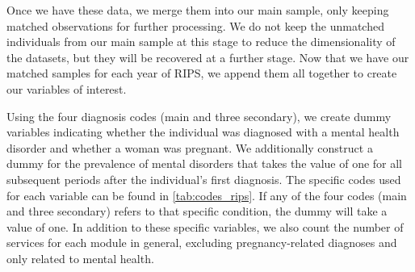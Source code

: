 \documentclass[12pt, a4paper]{article}
\begin{document}
Once we have these data, we merge them into our main sample, only keeping matched observations for further processing. We do not keep the unmatched individuals from our main sample at this stage to reduce the dimensionality of the datasets, but they will be recovered at a further stage. Now that we have our matched samples for each year of RIPS, we append them all together to create our variables of interest. 

Using the four diagnosis codes (main and three secondary), we create dummy variables indicating whether the individual was diagnosed with a mental health disorder and whether a woman was pregnant. We additionally construct a dummy for the prevalence of mental disorders that takes the value of one for all subsequent periods after the individual's first diagnosis. The specific codes used for each variable can be found in \autoref{tab:codes_rips}. If any of the four codes (main and three secondary) refers to that specific condition, the dummy will take a value of one. In addition to these specific variables, we also count the number of services for each module in general, excluding pregnancy-related diagnoses and only related to mental health.


\begin{table}[H]
  \centering
  \caption{ICD-10 codes used for RIPS dummies}
  \label{tab:codes_rips}
\end{table}
\end{document}
